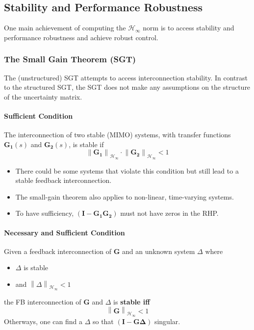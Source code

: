 \subsection{Stability and Performance Robustness}
One main achievement of computing the $\mathcal{H}_\infty$ norm is to access stability and performance robustness and achieve robust control.
\subsubsection{The Small Gain Theorem (SGT)}
The (unstructured) SGT attempts to access interconnection stability. In contrast to the structured SGT, the SGT does not make any assumptions on the structure of the uncertainty matrix.

\paragraph{Sufficient Condition}

The interconnection of two stable (MIMO) systems, with transfer functions $\mathbf{G_1}(s)$ and $\mathbf{G_2}(s)$, is stable if
\begin{equation*}
    \left\|\mathbf{G_1}\right\|_{\mathcal{H}_\infty}\cdot\left\|\mathbf{G_2}\right\|_{\mathcal{H}_\infty}<1
\end{equation*}

\begin{itemize}
    \item There could be some systems that violate this condition but still lead to a stable feedback interconnection.
    \item The small-gain theorem also applies to non-linear, time-varying systems.
    \item To have sufficiency, $(\mathbf{I}-\mathbf{G_1G_2})$ must not have zeros in the RHP.
\end{itemize}

\paragraph{Necessary and Sufficient Condition}
Given a feedback interconnection of $\mathbf{G}$ and an unknown system $\Delta$ where
\begin{itemize}
    \item $\Delta$ is stable
    \item and $\left\|\Delta\right\|_{\mathcal{H}_\infty}<1$
\end{itemize}
the FB interconnection of $\mathbf{G}$ and $\Delta$ is \textbf{stable iff}
\begin{equation*}
    \left\|\mathbf{G}\right\|_{\mathcal{H}_\infty}<1
\end{equation*}
Otherways, one can find a $\Delta$ so that $(\mathbf{I}-\mathbf{G\Delta})$ singular.\\

